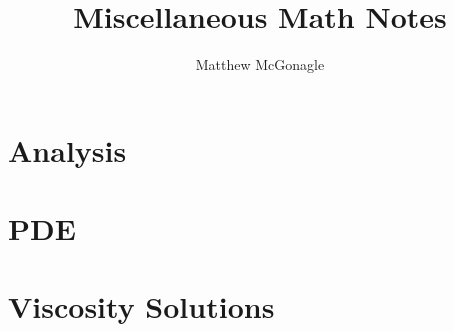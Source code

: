 \documentclass[14pt]{article}
\theoremstyle{definition}
\begin{document}
\title{Miscellaneous Math Notes}
\author{Matthew McGonagle}
\maketitle

%

\tableofcontents

\section{Analysis}



\section{PDE}



\section{Viscosity Solutions}





\end{document}
